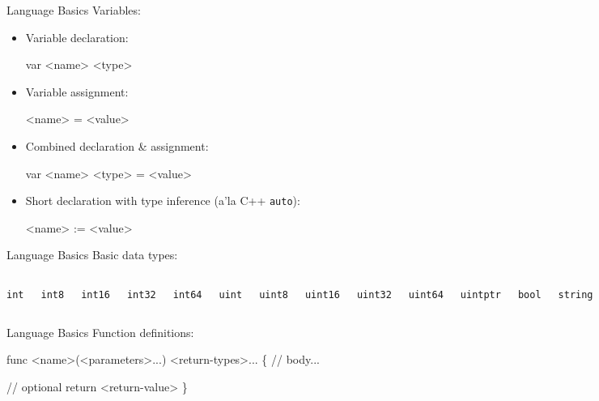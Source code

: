 \documentclass[pdf,xcolor=dvipsnames,noparindent]{beamer}
\begin{document}
\begin{frame}[fragile]{Language Basics}
  \pause
  Variables:
  \pause
  \begin{itemize}
  \item Variable declaration:
    \begin{semiverbatim}
      var <name> <type>
    \end{semiverbatim}
    \pause
  \item Variable assignment:
    \begin{semiverbatim}
      <name> = <value>
    \end{semiverbatim}
    \pause
  \item Combined declaration \& assignment:
    \begin{semiverbatim}
      var <name> <type> = <value>
    \end{semiverbatim}
    \pause
  \item Short declaration with type inference (a'la C++ \texttt{auto}):
    \begin{semiverbatim}
      <name> := <value>
    \end{semiverbatim}
  \end{itemize}
\end{frame}

\begin{frame}{Language Basics}
  \pause
  Basic data types:
  \pause
  \begin{itemize}
    \begin{columns}
    \item \texttt{int}
    \item \texttt{int8}
    \item \texttt{int16}
    \item \texttt{int32}
    \item \texttt{int64}
      \pause
    \item \texttt{uint}
    \item \texttt{uint8}
    \item \texttt{uint16}
    \item \texttt{uint32}
    \item \texttt{uint64}
    \item \texttt{uintptr}
      \pause
    \item \texttt{bool}
      \pause
    \item \texttt{string}
      \pause
    \item \texttt{byte}
    \item \texttt{rune}
      \pause
    \item \texttt{float32}
    \item \texttt{float64}
      \pause
    \item \texttt{complex64}
    \item \texttt{complex128}
      \end{columns}
  \end{itemize}
\end{frame}

\begin{frame}[fragile]{Language Basics}
  \pause
  Function definitions:
  \pause
  \begin{semiverbatim}
    func <name>(<parameters>...) <return-types>... \{
      // body... 
      
      // optional
      return <return-value>
    \}
  \end{semiverbatim}
\end{frame}
\end{document}
